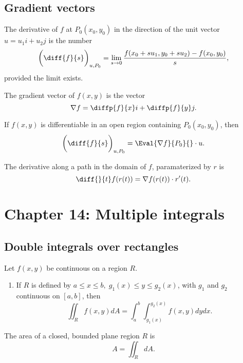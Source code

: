 \documentclass[oneside]{book}
\begin{document}
\subsection{Gradient vectors}
\begin{definition}
	The derivative of \(f\) at \(P_0(x_0,y_0)\) in the direction of the unit vector \(u=u_1i+u_2j\) is the number
	\begin{equation*}
		\bigg(\diff{f}{s}\bigg)_{u,P_0}=\lim_{s\rightarrow 0}\frac{f(x_0+su_1,y_0+su_2)-f(x_0,y_0)}{s},
	\end{equation*}
	provided the limit exists.
\end{definition}
\begin{definition}
	The gradient vector of \(f(x,y)\) is the vector
	\begin{equation*}
		\nabla f=\diffp{f}{x}i+\diffp{f}{y}j.
	\end{equation*}
\end{definition}
\begin{theorem}
	If \(f(x,y)\) is differentiable in an open region containing \(P_0(x_0,y_0)\), then
	\begin{equation*}
		\bigg(\diff{f}{s}\bigg)_{u,P_0}=\Eval{\nabla f}{P_0}{}\cdot u.
	\end{equation*}
\end{theorem}
\begin{proposition}
	The derivative along a path in the domain of \(f\), paramaterized by \(r\) is
	\begin{equation*}
		\diff{}{t}f(r(t))=\nabla f(r(t))\cdot r'(t).
	\end{equation*}
\end{proposition}
\section{Chapter 14: Multiple integrals}
\subsection{Double integrals over rectangles}
\begin{theorem}
	Let \(f(x,y)\) be continuous on a region \(R\).
	\begin{enumerate}
		\item If \(R\) is defined by \(a\leq x\leq b,\;g_1(x)\leq y\leq g_2(x)\), with \(g_1\) and \(g_2\) continuous on \([a,b]\), then
			\begin{equation*}
				\iint_R f(x,y)dA=\int_a^b\int_{g_1(x)}^{g_2(x)}f(x,y)dydx.
			\end{equation*}
	\end{enumerate}
\end{theorem}
\begin{proposition}
	The area of a closed, bounded plane region \(R\) is
	\begin{equation*}
		A=\iint_R dA.
	\end{equation*}
\end{proposition}
\end{document}
